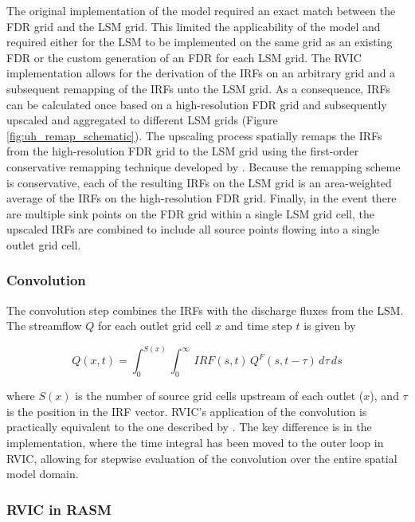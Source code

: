 \documentclass[jgrga, draft]{agutex}
\begin{document}
\begin{article}
The original implementation of the \citet{Lohmann_1996} model required an exact match between the FDR grid and the LSM grid.
This limited the applicability of the model and required either for the LSM to be implemented on the same grid as an existing FDR or the custom generation of an FDR for each LSM grid.
The RVIC implementation allows for the derivation of the IRFs on an arbitrary grid and a subsequent remapping of the IRFs unto the LSM grid.
As a consequence, IRFs can be calculated once based on a high-resolution FDR grid and subsequently upscaled and aggregated to different LSM grids (Figure \ref{fig:uh_remap_schematic}).
The upscaling process spatially remaps the IRFs from the high-resolution FDR grid to the LSM grid using the first-order conservative remapping technique developed by \citet{Jones_1999}.
Because the remapping scheme is conservative, each of the resulting IRFs on the LSM grid is an area-weighted average of the IRFs on the high-resolution FDR grid.
Finally, in the event there are multiple sink points on the FDR grid within a single LSM grid cell, the upscaled IRFs are combined to include all source points flowing into a single outlet grid cell.

\subsubsection{Convolution}
\label{sec:convolution}

The convolution step combines the IRFs with the discharge fluxes from the LSM.
The streamflow $Q$ for each outlet grid cell $x$ and time step $t$ is given by

\begin{equation}
  \label{eq:convolution}
   Q(x,t) = \int_0^{S(x)} \int_0^{\infty}\,IRF(s,t)\,Q^F(s,t-\tau)\,d\tau\,ds
 \end{equation}

where $S(x)$ is the number of source grid cells upstream of each outlet ($x$), and $\tau$ is the position in the IRF vector.
RVIC's application of the convolution is practically equivalent to the one described by \citet{Lohmann_1996}.
The key difference is in the implementation, where the time integral has been moved to the outer loop in RVIC, allowing for stepwise evaluation of the convolution over the entire spatial model domain.

\subsubsection{RVIC in RASM}


\end{article}
\end{document}
